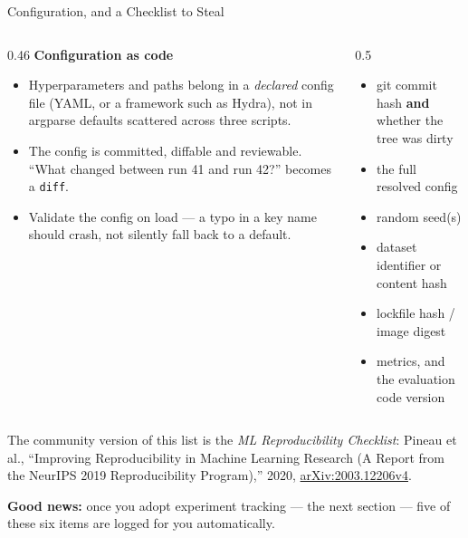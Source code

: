 
\begin{frame}{Configuration, and a Checklist to Steal}

    \begin{columns}[T]
        \begin{column}{0.46\textwidth}
            \textbf{Configuration as code}
            \scriptsize
            \begin{itemize}
                \item Hyperparameters and paths belong in a \emph{declared} config file (YAML, or a
                      framework such as Hydra), not in argparse defaults scattered across three scripts.
                \item The config is committed, diffable and reviewable. ``What changed between run 41 and
                      run 42?'' becomes a \texttt{diff}.
                \item Validate the config on load --- a typo in a key name should crash, not silently fall
                      back to a default.
            \end{itemize}
        \end{column}
        \begin{column}{0.5\textwidth}
            \begin{tcolorbox}[colback=green!5, colframe=green!50!black, title=\scriptsize Log with every run]
                \scriptsize
                \begin{itemize}
                    \item git commit hash \textbf{and} whether the tree was dirty
                    \item the full resolved config
                    \item random seed(s)
                    \item dataset identifier or content hash
                    \item lockfile hash / image digest
                    \item metrics, and the evaluation code version
                \end{itemize}
            \end{tcolorbox}
        \end{column}
    \end{columns}

    \vspace{0.18em}
    {\scriptsize The community version of this list is the \textit{ML Reproducibility Checklist}: Pineau et al.,
    ``Improving Reproducibility in Machine Learning Research (A Report from the NeurIPS 2019 Reproducibility Program),''
    2020, \href{https://arxiv.org/abs/2003.12206v4}{arXiv:2003.12206v4}.}

    \vspace{0.12em}
    {\scriptsize \textbf{Good news:} once you adopt experiment tracking --- the next section --- five of these six
    items are logged for you automatically.}

\end{frame}
